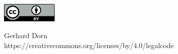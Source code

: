 \documentclass[12pt,a4paper]{article} %
\begin{document}



\vspace{2cm}
\begin{minipage}[t]{1\textwidth}
	\raggedleft
	\centering
	\includegraphics[width = 0.20\textwidth]{CC-BY_icon}
	\vspace{0.2cm}
	
	\centering
	{\Large Gerhard Dorn} \\
	https://creativecommons.org/licenses/by/4.0/legalcode
\end{minipage}





  
\end{document}
